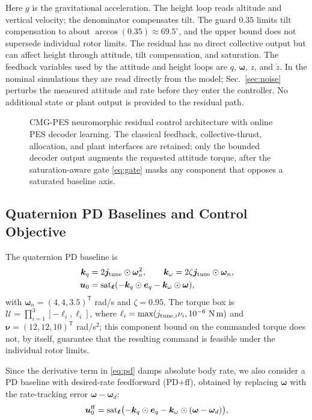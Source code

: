 \documentclass[letterpaper, 10 pt, conference]{ieeeconf}
\newcommand{\T}{^{\mathsf T}}
\newcommand{\sat}{\operatorname{sat}}
\begin{document}
Here $g$ is the gravitational acceleration. The height loop reads altitude and vertical velocity; the denominator compensates tilt.
The guard $0.35$ limits tilt compensation to about $\arccos(0.35)\approx69.5^\circ$, and the upper bound does
not supersede individual rotor limits. The residual has no direct collective
output but can affect height through attitude, tilt compensation, and
saturation.
The feedback variables used by the attitude and height loops are $q$, $\bm\omega$, $z$, and $\dot z$. In the nominal simulations they are read directly from the model; Sec.~\ref{sec:noise} perturbs the measured attitude and rate before they enter the controller. No additional state or plant output is provided to the residual path.

\begin{figure}[!th]
    \centering
    \resizebox{0.90\textwidth}{!}{}
    \caption{CMG-PES neuromorphic residual control architecture with online PES decoder learning. The classical feedback, collective-thrust, allocation, and plant interfaces are retained; only the bounded decoder output augments the requested attitude torque, after the saturation-aware gate \eqref{eq:gate} masks any component that opposes a saturated baseline axis.}
    \label{fig:arch}
\end{figure}

\subsection{Quaternion PD Baselines and Control Objective}

The quaternion PD baseline is
\begin{align}
 \bm k_q&=2\bm j_{\rm tune}\odot\bm\omega_n^2,\qquad
 \bm k_\omega=2\zeta\bm j_{\rm tune}\odot\bm\omega_n,\\
 \bm u_0&=\sat_{\bm\ell}(-\bm k_q\odot\bm e_q-\bm k_\omega\odot\bm\omega),
 \label{eq:pd}
\end{align}
with $\bm\omega_n=(4,4,3.5)\T$ rad/s and $\zeta=0.95$. The torque box is
$\mathcal U=\prod_{i=1}^3[-\ell_i,\ell_i]$, where
$\ell_i=\max(j_{{\rm tune},i}\nu_i,10^{-6}\ \mathrm{N\,m})$ and
$\bm\nu=(12,12,10)\T$ rad/s$^2$; this component bound on the commanded torque does not, by itself, guarantee that the resulting command is feasible under the individual rotor limits.

Since the derivative term in \eqref{eq:pd} damps absolute body rate,
we also consider a PD baseline with desired-rate feedforward (PD+ff),
obtained by replacing $\bm\omega$ with the rate-tracking error
$\bm\omega-\bm\omega_d$:
\begin{equation}
 \bm u_0^{\rm ff}=\sat_{\bm\ell}\bigl(-\bm k_q\odot\bm e_q-\bm k_\omega\odot(\bm\omega-\bm\omega_d)\bigr),
 \label{eq:pdff}
\end{equation}
\end{document}
